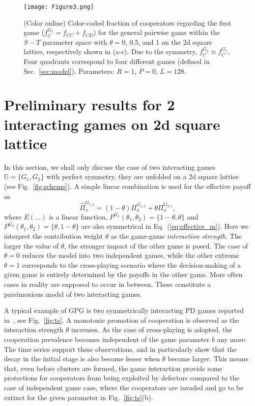 \documentclass[showpacs,superscriptaddress,reprint,nofootinbib,amsmath,amssymb,aps,pre]{revtex4-1}
\begin{document}
\begin{figure*}[htbp]
\centering
\texttt{[image: Figure3.png]}
\caption{(Color online)
Color-coded fraction of cooperators regarding the first game ($f^{G_1}_C=f_{CC}+f_{CD}$) for the general pairwise game within the $S-T$ parameter space with $\theta=0$, 0.5, and 1 on the 2d square lattice, respectively shown in (a-c). Due to the symmetry, $f^{G_2}_C\approx f^{G_1}_C$. Four quadrants correspond to four different games (defined in Sec.~\ref{sec:model}).
Parameters: $R=1$, $P=0$, $L=128$.  
}
\label{fig:GPG}
\end{figure*}
\section{Preliminary results for 2 interacting games on 2d square lattice}\label{sec:results}
In this section, we shall only discuss the case of two interacting games $\mathbb{G}=\{G_1,G_2\}$ with perfect symmetry, they are unfolded on a 2d square lattice (see Fig.~\ref{fig:scheme}).  A simple linear combination is used for the effective payoff as
\begin{equation}
\widehat{\Pi}_{x}^{G_{1,2}}=(1-\theta)\Pi_{x}^{G_{1,2}}+\theta \Pi_{x}^{G_{2,1}},
\label{eq:effective_linear}
\end{equation}
where $E(...)$ is a linear function, $P^{G_1}(\theta_1,\theta_2)=\{1-\theta,\theta\}$ and $P^{G_2}(\theta_1,\theta_2)=\{\theta,1-\theta\}$ are also symmetrical in Eq.~(\ref{eq:effective_m}). Here we interpret the contribution weight $\theta$ as the game-game \emph{interaction strength}. The larger the value of $\theta$, the stronger impact of the other game is posed. The case of $\theta=0$ reduces the model into two independent games, while the other extreme $\theta=1$ corresponds to the cross-playing scenario where the decision-making of a given game is entirely determined by the payoffs in the other game. More often cases in reality are supposed to occur in between. These constitute a parsimonious model of two interacting games.

A typical example of GPG is  two symmetrically interacting PD games reported in~\cite{CSL}, see Fig.~\ref{fig:ts}. 
A monotonic promotion of cooperation is observed as the interaction strength $\theta$ increases. As the case of cross-playing is adopted, the cooperation prevalence becomes independent of the game parameter $b$ any more. The time series support these observations, and in particularly show that the decay in the initial stage is also become lesser when $\theta$ become larger. This means that, even before clusters are formed, the game interaction provide some protections for cooperators from being exploited by defectors compared to the case of independent game case, where the cooperators are invaded and go to be extinct for the given parameter in Fig.~\ref{fig:ts}(b). 
\end{document}
